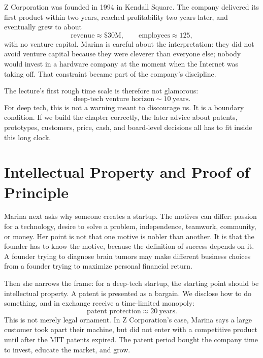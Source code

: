 Z Corporation was founded in 1994 in Kendall Square. The company delivered its first product within two years, reached profitability two years later, and eventually grew to about
\begin{equation}
\text{revenue}\approx \$30\text{M},\qquad
\text{employees}\approx 125,
\end{equation}
with no venture capital. Marina is careful about the interpretation: they did not avoid venture capital because they were cleverer than everyone else; nobody would invest in a hardware company at the moment when the Internet was taking off. That constraint became part of the company's discipline.

The lecture's first rough time scale is therefore not glamorous:
\begin{equation}
\text{deep-tech venture horizon}\sim 10\ \text{years}.
\end{equation}
For deep tech, this is not a warning meant to discourage us. It is a boundary condition. If we build the chapter correctly, the later advice about patents, prototypes, customers, price, cash, and board-level decisions all has to fit inside this long clock.

\section{Intellectual Property and Proof of Principle}

Marina next asks why someone creates a startup. The motives can differ: passion for a technology, desire to solve a problem, independence, teamwork, community, or money. Her point is not that one motive is nobler than another. It is that the founder has to know the motive, because the definition of success depends on it. A founder trying to diagnose brain tumors may make different business choices from a founder trying to maximize personal financial return.

Then she narrows the frame: for a deep-tech startup, the starting point should be intellectual property. A patent is presented as a bargain. We disclose how to do something, and in exchange receive a time-limited monopoly:
\begin{equation}
\text{patent protection}\approx 20\ \text{years}.
\end{equation}
This is not merely legal ornament. In Z Corporation's case, Marina says a large customer took apart their machine, but did not enter with a competitive product until after the MIT patents expired. The patent period bought the company time to invest, educate the market, and grow.

